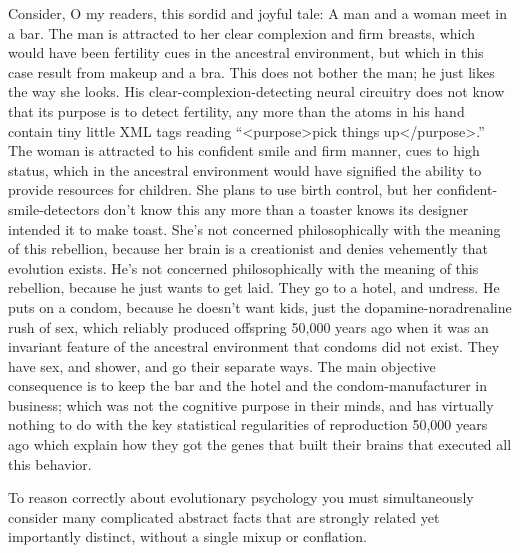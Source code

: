  Consider, O my readers, this sordid and joyful tale: A man and a
woman meet in a bar. The man is attracted to her clear complexion and
firm breasts, which would have been fertility cues in the ancestral
environment, but which in this case result from makeup and a bra. This
does not bother the man; he just likes the way she looks. His
clear-complexion-detecting neural circuitry does not know that its
purpose is to detect fertility, any more than the atoms in his hand
contain tiny little XML tags reading
``{\textless}purpose{\textgreater}pick things
up{\textless}/purpose{\textgreater}.'' The woman is
attracted to his confident smile and firm manner, cues to high status,
which in the ancestral environment would have signified the ability to
provide resources for children. She plans to use birth control, but her
confident-smile-detectors don't know this any more than
a toaster knows its designer intended it to make toast.
She's not concerned philosophically with the meaning of
this rebellion, because her brain is a creationist and denies
vehemently that evolution exists. He's not concerned
philosophically with the meaning of this rebellion, because he just
wants to get laid. They go to a hotel, and undress. He puts on a
condom, because he doesn't want kids, just the
dopamine-noradrenaline rush of sex, which reliably produced offspring
50,000 years ago when it was an invariant feature of the ancestral
environment that condoms did not exist. They have sex, and shower, and
go their separate ways. The main objective consequence is to keep the
bar and the hotel and the condom-manufacturer in business; which was
not the cognitive purpose in their minds, and has virtually nothing to
do with the key statistical regularities of reproduction 50,000 years
ago which explain how they got the genes that built their brains that
executed all this behavior.


 To reason correctly about evolutionary psychology you must
simultaneously consider many complicated abstract facts that are
strongly related yet importantly distinct, without a single mixup or
conflation.

\myendsectiontext



